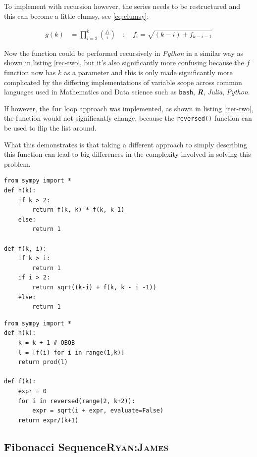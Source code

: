 \documentclass[11pt]{article}
\begin{document}
To implement with recursion however, the series needs to be restructured and
this can become a little clumsy, see \eqref{eq:clumsy}:

\begin{align}
    g\left( k \right) &=  \prod^k_{i = 2} \left( \frac{f_i}{i}  \right) \quad : \quad f_{i} = \sqrt{\left( k- i \right)  +  f_{k - i - 1}} \label{eq:clumsy}
\end{align}

Now the function could be performed recursively in \emph{Python} in a similar way as
shown in listing \ref{rec-two}, but it's also significantly more confusing because the
\(f\) function now has \(k\) as a parameter and this is only made significantly more
complicated by the differing implementations of variable scope across common
languages used in Mathematics and Data science such as \texttt{bash}, \textbf{\emph{R}}, \emph{Julia}, \emph{Python}.

If however, the \texttt{for} loop approach was implemented, as shown in listing
\ref{iter-two}, the function would not significantly change, because the \texttt{reversed()} function can be
used to flip the list around.

What this demonstrates is that taking a different approach to simply describing
this function can lead to big differences in the complexity involved in solving
this problem.

\begin{lstlisting}
from sympy import *
def h(k):
    if k > 2:
        return f(k, k) * f(k, k-1)
    else:
        return 1

def f(k, i):
    if k > i:
        return 1
    if i > 2:
        return sqrt((k-i) + f(k, k - i -1))
    else:
        return 1
\end{lstlisting}


\begin{lstlisting}
from sympy import *
def h(k):
    k = k + 1 # OBOB
    l = [f(i) for i in range(1,k)]
    return prod(l)

def f(k):
    expr = 0
    for i in reversed(range(2, k+2)):
        expr = sqrt(i + expr, evaluate=False)
    return expr/(k+1)
\end{lstlisting}

\subsection{Fibonacci Sequence\hfill{}\textsc{Ryan:James}}
\label{sec:org6a07e3e}
\end{document}
